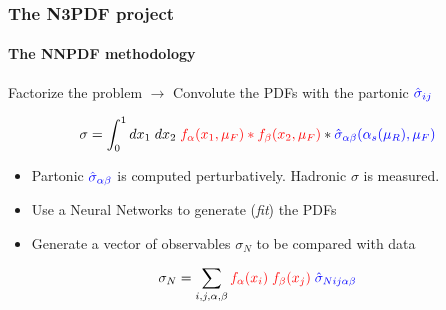 \documentclass[aspectratio=43]{beamer}
\begin{document}
\begin{frame}

	\frametitle{The N3PDF project}
	\framesubtitle{The NNPDF methodology}
	
	Factorize the problem $\longrightarrow$ Convolute the {\color{red}PDFs}  with the partonic ${\color{blue}\hat{\sigma}_{i j}}$
	
	\begin{equation}
	\sigma = \int_{0}^{1} dx_{1} \; dx_{2} \; {\color{red} f_{\alpha}(x_{1}, \mu_{F}) \ast f_{\beta}(x_{2}, \mu_{F})} \ast {\color{blue}\hat{\sigma}_{\alpha \beta}(\alpha_{s}(\mu_{R}), \mu_{F})} \; \nonumber
	\end{equation}
	
	\begin{itemize}
		\item Partonic ${\color{blue}\hat{\sigma}_{\alpha\beta}}$ is computed perturbatively. Hadronic $\sigma$ is measured.
		\item Use a Neural Networks to generate (\textit{fit}) the PDFs
		\item Generate a vector of observables $\sigma_{N}$ to be compared with data
	\end{itemize}
	
	\begin{equation}
	\sigma_{N} = \sum_{i, j, \alpha, \beta} {\color{red}f_{\alpha}(x_{i}) \; f_{\beta}(x_{j})} \; {\color{blue}\hat{\sigma}_{N i j \alpha \beta}} \; \nonumber
	\end{equation}

\end{frame}
\end{document}
